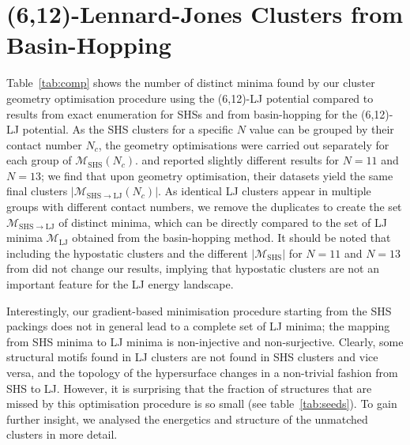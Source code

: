 \section{(6,12)-Lennard-Jones Clusters from Basin-Hopping} 
\label{sec:612LennardJonesClustersfromBasinHopping}

Table~\ref{tab:comp} shows the number of distinct minima found by our cluster
geometry optimisation procedure using the (6,12)-LJ potential compared to
results from exact enumeration for \ac{SHS}s and from basin-hopping for the (6,12)-LJ
potential.  As the \ac{SHS} clusters for a specific $N$ value can be grouped by
their contact number $N_c$, the geometry optimisations were carried out
separately for each group of $\mathcal{M}_\mathrm{SHS}(N_c)$. \citeauthor{Hoy_Structurefinitesphere_2012}
\autocite{Hoy_Structurefinitesphere_2012,Hoy_Structuredynamicsmodel_2015} and \citeauthor{Holmes-Cerfon_EnumeratingRigidSphere_2016}\autocite{Holmes-Cerfon_EnumeratingRigidSphere_2016}  reported
slightly different results
for $N=11$ and $N=13$; we find that upon geometry optimisation,
their datasets yield the same final clusters
$|\mathcal{M}_{\mathrm{SHS\to LJ}}(N_c)|$.  As identical LJ clusters appear in
multiple groups with different contact numbers, we remove the duplicates to
create the set $\mathcal{M}_\mathrm{SHS\to LJ}$ of distinct minima, which can
be directly compared to the set of LJ minima $\mathcal{M}_\mathrm{LJ}$ obtained
from the basin-hopping method. It should be noted that including the hypostatic
clusters and the different $|\mathcal{M}_\mathrm{SHS}|$ for $N=11$ and $N=13$
from \citeauthor{Holmes-Cerfon_EnumeratingRigidSphere_2016}\autocite{Holmes-Cerfon_EnumeratingRigidSphere_2016} did not change our results, implying that hypostatic
clusters are not an important feature for the LJ energy landscape. 


Interestingly, our gradient-based minimisation procedure starting from the \ac{SHS}
packings does not in general lead to a complete set of LJ minima; the mapping
from \ac{SHS} minima to LJ minima is non-injective and non-surjective.  Clearly,
some structural motifs found in LJ clusters are not found in \ac{SHS} clusters and
vice versa, and the topology of the hypersurface changes in a non-trivial
fashion from \ac{SHS} to LJ.  However, it is surprising that the fraction of
structures that are missed by this optimisation procedure is so small (see
table~\ref{tab:seeds}). To gain further insight, we analysed the energetics and
structure of the unmatched clusters in more detail.

